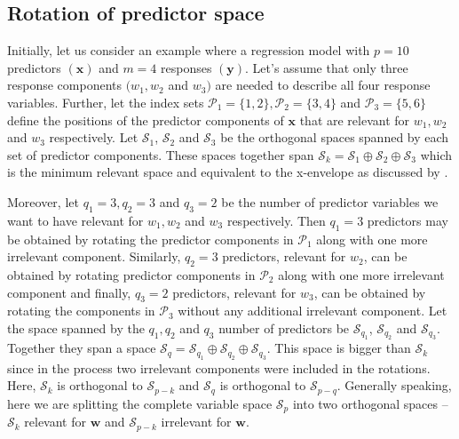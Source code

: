 \documentclass[review]{elsarticle}
\theoremstyle{definition}
\theoremstyle{definition}
\theoremstyle{remark}
\begin{document}
\subsection{Rotation of predictor
space}\label{rotation-of-predictor-space}

Initially, let us consider an example where a regression model with
\(p = 10\) predictors \((\mathbf{x})\) and \(m = 4\) responses
\((\mathbf{y})\). Let's assume that only three response components
\((w_1, w_2\) and \(w_3)\) are needed to describe all four response
variables. Further, let the index sets
\(\mathcal{P}_1 = \{1, 2\}, \mathcal{P}_2 = \{3, 4\}\) and
\(\mathcal{P}_3 = \{5, 6\}\) define the positions of the predictor
components of \(\mathbf{x}\) that are relevant for \(w_1, w_2\) and
\(w_3\) respectively. Let \(\mathcal{S}_1\), \(\mathcal{S}_2\) and
\(\mathcal{S}_3\) be the orthogonal spaces spanned by each set of
predictor components. These spaces together span
\(\mathcal{S}_k = \mathcal{S}_1 \oplus \mathcal{S}_2 \oplus \mathcal{S}_3\)
which is the minimum relevant space and equivalent to the x-envelope as
discussed by \citet{cook2013envelopes}.

Moreover, let \(q_1 = 3, q_2 = 3\) and \(q_3 = 2\) be the number of
predictor variables we want to have relevant for \(w_1, w_2\) and
\(w_3\) respectively. Then \(q_1 = 3\) predictors may be obtained by
rotating the predictor components in \(\mathcal{P}_1\) along with one
more irrelevant component. Similarly, \(q_2 = 3\) predictors, relevant
for \(w_2\), can be obtained by rotating predictor components in
\(\mathcal{P}_2\) along with one more irrelevant component and finally,
\(q_3 = 2\) predictors, relevant for \(w_3\), can be obtained by
rotating the components in \(\mathcal{P}_3\) without any additional
irrelevant component. Let the space spanned by the \(q_1, q_2\) and
\(q_3\) number of predictors be \(\mathcal{S}_{q_1}\),
\(\mathcal{S}_{q_2}\) and \(\mathcal{S}_{q_3}\). Together they span a
space
\(\mathcal{S}_q = \mathcal{S}_{q_1} \oplus \mathcal{S}_{q_2} \oplus \mathcal{S}_{q_3}\).
This space is bigger than \(\mathcal{S}_k\) since in the process two
irrelevant components were included in the rotations. Here,
\(\mathcal{S}_k\) is orthogonal to \(\mathcal{S}_{p - k}\) and
\(\mathcal{S}_q\) is orthogonal to \(\mathcal{S}_{p - q}\). Generally
speaking, here we are splitting the complete variable space
\(\mathcal{S}_p\) into two orthogonal spaces -- \(\mathcal{S}_k\)
relevant for \(\mathbf{w}\) and \(\mathcal{S}_{p - k}\) irrelevant for
\(\mathbf{w}\).
\end{document}
